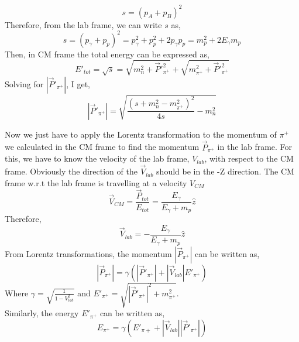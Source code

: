\vspace{0.1cm}
\begin{equation}
   s = (p_A + p_B)^2
\end{equation}
Therefore, from the lab frame, we can write $s$ as, 
\begin{equation}\label{equ: Mandelstam s in lab fram}
    s = (p_{\gamma} + p_{p})^2 = p_{\gamma}^2+p_{p}^2+2p_{\gamma}p_{p} = m_p^2 + 2E_{\gamma}m_p
\end{equation}
Then, in CM frame the total energy can be expressed as,
\begin{equation}\label{equ: Mandelstam s in CM frame}
 E'_{tot} = \sqrt{s} = \sqrt{m_n^2 + \vec{P}'^2_{\pi^+}} + \sqrt{m^2_{\pi^+} + \vec{P}'^2_{\pi^+}} 
\end{equation}
Solving for $|\vec{P}'_{\pi^+}|$, I get,
\begin{equation}
  |\vec{P}'_{\pi^+}| = \sqrt{\frac{(s+m_n^2-m_{\pi^+}^2)^2}{4s} - m_n^2}  
  \label{equ:piplus_momentum}  
\end{equation}

\vspace{0.3cm}
Now we just have to apply the Lorentz transformation to the momentum of $\pi^+$ we calculated in the CM frame to find the momentum $\vec{P}_{\pi^+}$ in the lab frame. For this, we have to know the velocity of the lab frame, $V_{lab}$, with respect to the CM frame. Obviously the direction of the $\vec{V}_{lab}$ should be in the -Z direction. The CM frame w.r.t the lab frame is travelling at a velocity $V_{CM}$
\begin{equation}
    \vec{V}_{CM} = \frac{\vec{P}_{tot}}{E_{tot}} = \frac{E_{\gamma}}{E_{\gamma}+m_p}\hat{z}
    \label{equ:V_CM}
\end{equation}
Therefore, 
\begin{equation}
    \vec{V}_{lab} = -\frac{E_{\gamma}}{E_{\gamma}+m_p}\hat{z}
    \label{equ:V_lab}
\end{equation}
From Lorentz transformations, the momentum $|\vec{P}_{\pi^+}|$ can be written as,
\begin{equation}
    |\vec{P}_{\pi^+}| = \gamma(|\vec{P}'_{\pi^+}| + |\vec{V}_{lab}|E'_{\pi^+})
    \label{equ:max_piplus_mom_inlab}
\end{equation}
Where $\gamma = \sqrt{\frac{1}{1-V_{lab}^2}}$ and $E'_{\pi^+} = \sqrt{|\vec{P}'_{\pi^+}|^2+m_{\pi^+}^2}$.\\
Similarly, the energy $E'_{\pi^+}$ can be written as,
\begin{equation}
    E_{\pi^+} = \gamma(E'_{\pi+} + |\vec{V}_{lab}||\vec{P}'_{\pi^+}|)
    \label{equ:max_piplus_energy_inlab}
\end{equation}


